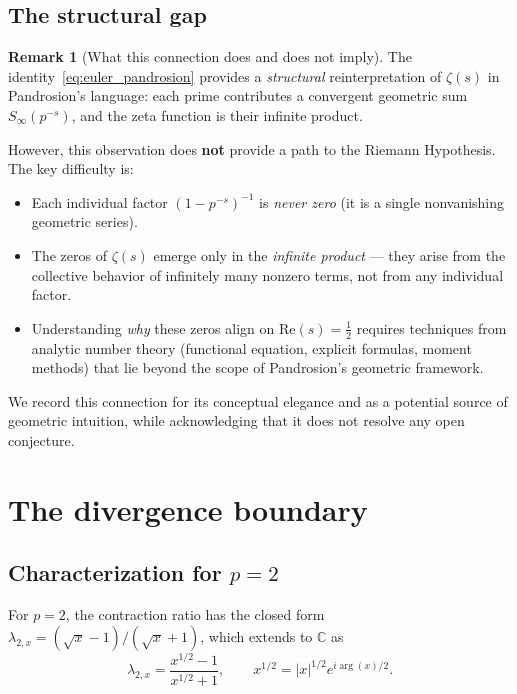 \documentclass[11pt,a4paper]{article}
\theoremstyle{definition}
\newtheorem{remark}{Remark}[section]
\newcommand{\CC}{\mathbb{C}}
\begin{document}
\subsection{The structural gap}

\begin{remark}[What this connection does and does not imply]
\label{rem:honest}
The identity~\eqref{eq:euler_pandrosion} provides a \emph{structural} reinterpretation of $\zeta(s)$ in Pandrosion's language: each prime contributes a convergent geometric sum $S_\infty(p^{-s})$, and the zeta function is their infinite product.

However, this observation does \textbf{not} provide a path to the Riemann Hypothesis.  The key difficulty is:
\begin{itemize}
  \item Each individual factor $(1 - p^{-s})^{-1}$ is \emph{never zero} (it is a single nonvanishing geometric series).
  \item The zeros of $\zeta(s)$ emerge only in the \emph{infinite product} --- they arise from the collective behavior of infinitely many nonzero terms, not from any individual factor.
  \item Understanding \emph{why} these zeros align on $\mathrm{Re}(s) = \tfrac{1}{2}$ requires techniques from analytic number theory (functional equation, explicit formulas, moment methods) that lie beyond the scope of Pandrosion's geometric framework.
\end{itemize}
We record this connection for its conceptual elegance and as a potential source of geometric intuition, while acknowledging that it does not resolve any open conjecture.
\end{remark}

\section{The divergence boundary}
\label{sec:divergence}

\subsection{Characterization for \texorpdfstring{$p = 2$}{p=2}}

For $p = 2$, the contraction ratio has the closed form $\lambda_{2,x} = (\sqrt{x} - 1)/(\sqrt{x} + 1)$, which extends to $\CC$ as
\[
  \lambda_{2,x} = \frac{x^{1/2} - 1}{x^{1/2} + 1},
  \qquad x^{1/2} = |x|^{1/2} e^{i\arg(x)/2}.
\]
\end{document}
